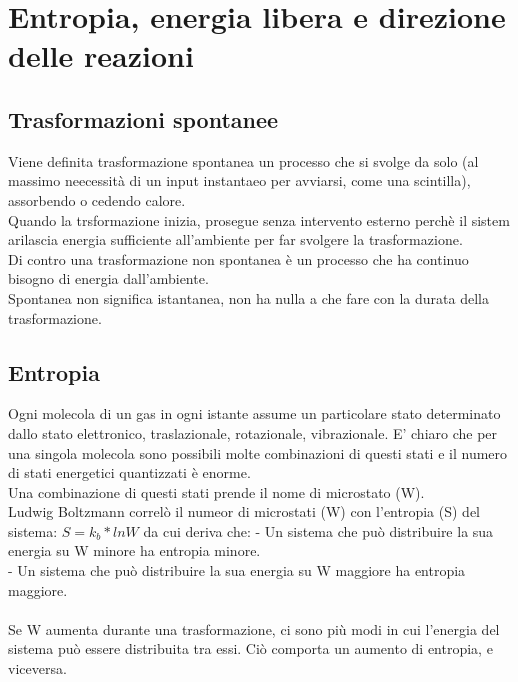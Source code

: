\section{Entropia, energia libera e direzione delle reazioni}
\subsection{Trasformazioni spontanee}
Viene definita trasformazione spontanea un processo che si svolge da solo (al massimo neecessità di un input instantaeo per avviarsi, come una scintilla), assorbendo o cedendo calore.\\
Quando la trsformazione inizia, prosegue senza intervento esterno perchè il sistem arilascia energia sufficiente all'ambiente per far svolgere la trasformazione.\\
Di contro una trasformazione non spontanea è un processo che ha continuo bisogno di energia dall'ambiente.\\
Spontanea non significa istantanea, non ha nulla a che fare con la durata della trasformazione.
\subsection{Entropia}
Ogni molecola di un gas in ogni istante assume un particolare stato determinato dallo stato elettronico, traslazionale, rotazionale, vibrazionale. E' chiaro che per una singola molecola sono possibili molte combinazioni di questi stati e il numero di stati energetici quantizzati è enorme.\\
Una combinazione di questi stati prende il nome di microstato (W).\\
Ludwig Boltzmann correlò il numeor di microstati (W) con l'entropia (S) del sistema: $S = k_b * lnW$ da cui deriva che:
\tab- Un sistema che può distribuire la sua energia su W minore ha entropia minore.\\
\tab- Un sistema che può distribuire la sua energia su W maggiore ha entropia maggiore.\\\\
Se W aumenta durante una trasformazione, ci sono più modi in cui l'energia del sistema può essere distribuita tra essi. Ciò comporta un aumento di entropia, e viceversa.\\
